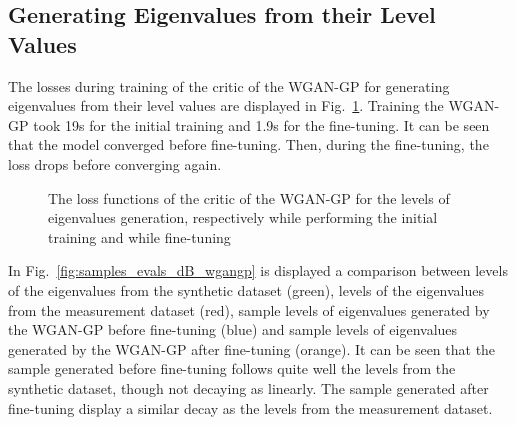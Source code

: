\documentclass[11pt,a4paper,twoside]{report}
\begin{document}
\subsection{Generating Eigenvalues from their Level Values}

The losses during training of the critic of the WGAN-GP for generating eigenvalues from their level values are displayed in Fig.~\ref{fig:loss_evals_dB_wgangp}. Training the WGAN-GP took 19s for the initial training and 1.9s for the fine-tuning. It can be seen that the model converged before fine-tuning. Then, during the fine-tuning, the loss drops before converging again.

\begin{figure}
    \centering
    \caption{The loss functions of the critic of the WGAN-GP for the levels of eigenvalues generation, respectively while performing the initial training and while fine-tuning}
    \label{fig:loss_evals_dB_wgangp}
\end{figure}


In Fig.~\ref{fig:samples_evals_dB_wgangp} is displayed a comparison between levels of the eigenvalues from the synthetic dataset (green), levels of the eigenvalues from the measurement dataset (red), sample levels of eigenvalues generated by the WGAN-GP before fine-tuning (blue) and sample levels of eigenvalues generated by the WGAN-GP after fine-tuning (orange). It can be seen that the sample generated before fine-tuning follows quite well the levels from the synthetic dataset, though not decaying as linearly. The sample generated after fine-tuning display a similar decay as the levels from the measurement dataset.
\end{document}
